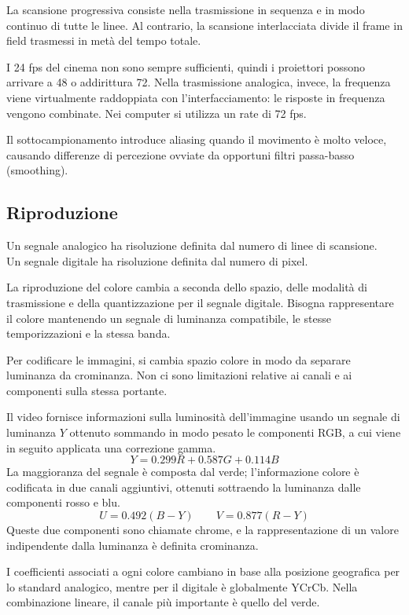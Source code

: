 La scansione progressiva consiste nella trasmissione in sequenza e in modo continuo di tutte le linee. Al contrario, la scansione interlacciata divide il frame in field trasmessi in metà del tempo totale.

I 24 fps del cinema non sono sempre sufficienti, quindi i proiettori possono arrivare a 48 o addirittura 72. Nella trasmissione analogica, invece, la frequenza viene virtualmente raddoppiata con l'interfacciamento: le risposte in frequenza vengono combinate. Nei computer si utilizza un rate di 72 fps.

Il sottocampionamento introduce aliasing quando il movimento è molto veloce, causando differenze di percezione ovviate da opportuni filtri passa-basso (smoothing). 

\subsection{Riproduzione}
Un segnale analogico ha risoluzione definita dal numero di linee di scansione. \\
Un segnale digitale ha risoluzione definita dal numero di pixel.

La riproduzione del colore cambia a seconda dello spazio, delle modalità di trasmissione e della quantizzazione per il segnale digitale. Bisogna rappresentare il colore mantenendo un segnale di luminanza compatibile, le stesse temporizzazioni e la stessa banda.

Per codificare le immagini, si cambia spazio colore in modo da separare luminanza da crominanza. Non ci sono limitazioni relative ai canali e ai componenti sulla stessa portante. 

Il video fornisce informazioni sulla luminosità dell'immagine usando un segnale di luminanza $Y$ ottenuto sommando in modo pesato le componenti RGB, a cui viene in seguito applicata una correzione gamma. 
$$ Y = 0.299R + 0.587G + 0.114B$$
La maggioranza del segnale è composta dal verde; l'informazione colore è codificata in due canali aggiuntivi, ottenuti sottraendo la luminanza dalle componenti rosso e blu.
$$ U = 0.492(B - Y) \qquad V = 0.877(R - Y)$$
Queste due componenti sono chiamate chrome, e la rappresentazione di un valore indipendente dalla luminanza è definita crominanza. 

I coefficienti associati a ogni colore cambiano in base alla posizione geografica per lo standard analogico, mentre per il digitale è globalmente YCrCb. Nella combinazione lineare, il canale più importante è quello del verde. 


